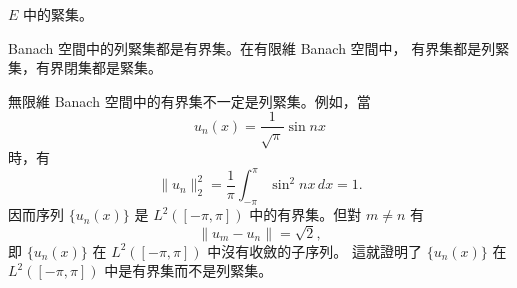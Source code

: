 \documentclass[11pt,a4paper,twoside]{article}
\newif\ifstudynotes
\newcommand{\StudyNote}[2]{%
    \ifstudynotes
    \begin{studyNote}[title={#1}]
    #2
    \end{studyNote}
    \fi
}
\newcommand{\pnum}[1]{%
    \makebox[0pt][r]{%
        \scriptsize\textbf{[#1]}\hspace{0.7em}%
    }%
}
\begin{document}
\noindent
\pnum{47}
$E$ 中的緊集。

\noindent
\pnum{48}
Banach 空間中的列緊集都是有界集。在有限維 Banach 空間中，
有界集都是列緊集，有界閉集都是緊集。
\StudyNote{複習註解：為什麼有限維與無限維要特別區分？}{
    依本書的敘述，在有限維 Banach 空間中，有界集具有列緊性；
    若再加上閉性，就得到緊集。

    但在無限維 Banach 空間中，
    \[
        \boxed{\text{有界}\not\Rightarrow\text{列緊}.}
    \]

    下一個例子取
    \[
        \nu_n(x)=\frac1{\sqrt{\pi}}\sin nx.
    \]
    雖然每一個函數都滿足
    \[
        \|u_n\|_2=1,
    \]
    所以集合 $\{u_n\}$ 是有界的，但當 $m\neq n$ 時，
    \[
        \|u_m-u_n\|_2=\sqrt2.
    \]

    也就是任意兩個不同元素之間始終保持固定距離，
    因此不可能從中抽出 Cauchy 子序列，也就不可能抽出收斂子序列。

    所以這個例子要強調的是：
    \[
        \boxed{
            \text{無限維空間中，只有「有界」還不足以保證列緊。}
        }
    \]
}

\noindent
\pnum{49}
無限維 Banach 空間中的有界集不一定是列緊集。例如，當
\[
    u_n(x)=\frac{1}{\sqrt{\pi}}\sin nx
\]
時，有
\[
    \|u_n\|_2^2
    =
    \frac{1}{\pi}
    \int_{-\pi}^{\pi}\sin^2 nx\,dx
    =
    1.
\]
因而序列 $\{u_n(x)\}$ 是 $L^2([-\pi,\pi])$ 中的有界集。但對 $m\neq n$ 有
\[
    \|u_m-u_n\|=\sqrt{2},
\]
即 $\{u_n(x)\}$ 在 $L^2([-\pi,\pi])$ 中沒有收斂的子序列。
這就證明了 $\{u_n(x)\}$ 在 $L^2([-\pi,\pi])$ 中是有界集而不是列緊集。
\end{document}
